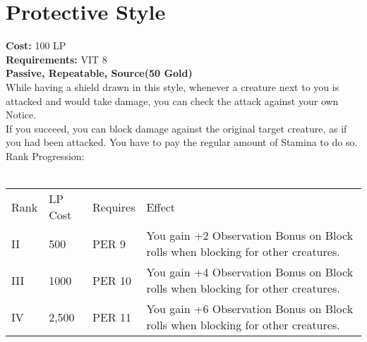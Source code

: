 \section{Protective Style}\label{perk:protectiveStyle}
\textbf{Cost:} 100 LP\\
\textbf{Requirements:} VIT 8\\
\textbf{Passive, Repeatable, Source(50 Gold)}\\
While having a shield drawn in this style, whenever a creature next to you is attacked and would take damage, you can check the attack against your own Notice.\\
If you succeed, you can block damage against the original target creature, as if you had been attacked.
You have to pay the regular amount of Stamina to do so.\\
Rank Progression:\\
\\
\begin{tabular}{l | l | l | l}
    Rank & LP Cost & Requires & Effect\\
    II & 500 & PER 9 & You gain +2 Observation Bonus on Block rolls when blocking for other creatures.\\
    III & 1000 & PER 10 & You gain +4 Observation Bonus on Block rolls when blocking for other creatures.\\
    IV & 2,500 & PER 11 & You gain +6 Observation Bonus on Block rolls when blocking for other creatures.\\
\end{tabular}